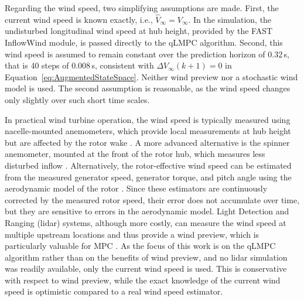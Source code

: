 Regarding the wind speed, two simplifying assumptions are made. First, the current wind speed is known exactly, i.e., $\hat{V}_\infty = V_\infty$. In the simulation, the undisturbed longitudinal wind speed at hub height, provided by the FAST InflowWind module, is passed directly to the qLMPC algorithm. Second, this wind speed is assumed to remain constant over the prediction horizon of 0.32\,s, that is 40 steps of 0.008\,s, consistent with $\Delta V_{\infty}(k+1) = 0$ in Equation~\eqref{eq:AugmentedStateSpace}. Neither wind preview nor a stochastic wind model is used. The second assumption is reasonable, as the wind speed changes only slightly over such short time scales.

In practical wind turbine operation, the wind speed is typically measured using nacelle-mounted anemometers, which provide local measurements at hub height but are affected by the rotor wake \cite{smith2002applicability}. A more advanced alternative is the spinner anemometer, mounted at the front of the rotor hub, which measures less disturbed inflow \cite{demurtas2017spinaranemometer}. Alternatively, the rotor-effective wind speed can be estimated from the measured generator speed, generator torque, and pitch angle using the aerodynamic model of the rotor \cite{soltani2013estimation}. Since these estimators are continuously corrected by the measured rotor speed, their error does not accumulate over time, but they are sensitive to errors in the aerodynamic model. Light Detection and Ranging (lidar) systems, although more costly, can measure the wind speed at multiple upstream locations and thus provide a wind preview, which is particularly valuable for MPC \cite{schlipf2013nonlinear}. As the focus of this work is on the qLMPC algorithm rather than on the benefits of wind preview, and no lidar simulation was readily available, only the current wind speed is used. This is conservative with respect to wind preview, while the exact knowledge of the current wind speed is optimistic compared to a real wind speed estimator.


